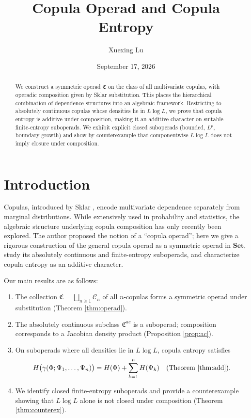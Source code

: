 \documentclass[11pt]{amsart}
\begin{document}
\begin{sloppypar}

\title{Copula Operad and Copula Entropy}
\author{Xuexing Lu}
\address{School of Mathematics and Statistics, Zaozhuang University}

\date{September 17, 2026}

\begin{abstract}
We construct a symmetric operad $\mathfrak{C}$ on the class of all multivariate copulas, with operadic composition given by Sklar substitution. This places the hierarchical combination of dependence structures into an algebraic framework. Restricting to absolutely continuous copulas whose densities lie in $L\log L$, we prove that copula entropy is additive under composition, making it an additive character on suitable finite-entropy suboperads. We exhibit explicit closed suboperads (bounded, $L^{p}$, boundary-growth) and show by counterexample that componentwise $L\log L$ does not imply closure under composition.
\end{abstract}

\maketitle

\section{Introduction}
Copulas, introduced by Sklar \cite{sklar}, encode multivariate dependence separately from marginal distributions. While extensively used in probability and statistics, the algebraic structure underlying copula composition has only recently been explored. The author \cite{lu2024} proposed the notion of a ``copula operad''; here we give a rigorous construction of the general copula operad as a symmetric operad \cite{loday} in $\mathbf{Set}$, study its absolutely continuous and finite-entropy suboperads, and characterize copula entropy as an additive character.

Our main results are as follows:
\begin{enumerate}
\item[(1)] The collection $\mathfrak{C}=\bigsqcup_{n\geq 1}\mathcal{C}_{n}$ of all $n$-copulas forms a symmetric operad under substitution (Theorem \ref{thm:operad}).
\item[(2)] The absolutely continuous subclass $\mathfrak{C}^{ac}$ is a suboperad; composition corresponds to a Jacobian density product (Proposition \ref{prop:ac}).
\item[(3)] On suboperads where all densities lie in $L\log L$, copula entropy satisfies
\[ \displaystyle H\bigl(\gamma(\Phi;\Psi_{1},\dots,\Psi_{n})\bigr)=H(\Phi)+\sum_{k=1}^{n} H(\Psi_{k}) \quad (\text{Theorem \ref{thm:add}}). \]
\item[(4)] We identify closed finite-entropy suboperads and provide a counterexample showing that $L\log L$ alone is not closed under composition (Theorem \ref{thm:counterex}).
\end{enumerate}


\end{sloppypar}
\end{document}
